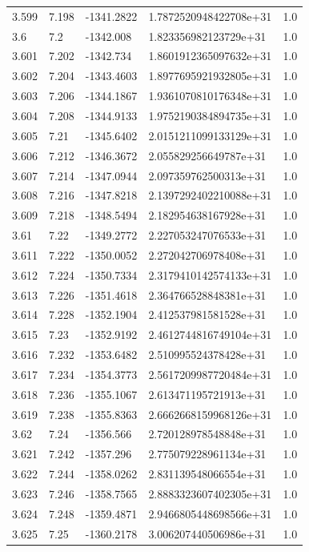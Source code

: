 \begin{tabular}{lllll}
3.599 & 7.198 & -1341.2822 & 1.7872520948422708e+31 & 1.0 \\
3.6 & 7.2 & -1342.008 & 1.823356982123729e+31 & 1.0 \\
3.601 & 7.202 & -1342.734 & 1.8601912365097632e+31 & 1.0 \\
3.602 & 7.204 & -1343.4603 & 1.8977695921932805e+31 & 1.0 \\
3.603 & 7.206 & -1344.1867 & 1.9361070810176348e+31 & 1.0 \\
3.604 & 7.208 & -1344.9133 & 1.9752190384894735e+31 & 1.0 \\
3.605 & 7.21 & -1345.6402 & 2.0151211099133129e+31 & 1.0 \\
3.606 & 7.212 & -1346.3672 & 2.055829256649787e+31 & 1.0 \\
3.607 & 7.214 & -1347.0944 & 2.097359762500313e+31 & 1.0 \\
3.608 & 7.216 & -1347.8218 & 2.1397292402210088e+31 & 1.0 \\
3.609 & 7.218 & -1348.5494 & 2.182954638167928e+31 & 1.0 \\
3.61 & 7.22 & -1349.2772 & 2.227053247076533e+31 & 1.0 \\
3.611 & 7.222 & -1350.0052 & 2.272042706978408e+31 & 1.0 \\
3.612 & 7.224 & -1350.7334 & 2.3179410142574133e+31 & 1.0 \\
3.613 & 7.226 & -1351.4618 & 2.364766528848381e+31 & 1.0 \\
3.614 & 7.228 & -1352.1904 & 2.412537981581528e+31 & 1.0 \\
3.615 & 7.23 & -1352.9192 & 2.4612744816749104e+31 & 1.0 \\
3.616 & 7.232 & -1353.6482 & 2.510995524378428e+31 & 1.0 \\
3.617 & 7.234 & -1354.3773 & 2.5617209987720484e+31 & 1.0 \\
3.618 & 7.236 & -1355.1067 & 2.613471195721913e+31 & 1.0 \\
3.619 & 7.238 & -1355.8363 & 2.6662668159968126e+31 & 1.0 \\
3.62 & 7.24 & -1356.566 & 2.720128978548848e+31 & 1.0 \\
3.621 & 7.242 & -1357.296 & 2.775079228961134e+31 & 1.0 \\
3.622 & 7.244 & -1358.0262 & 2.831139548066554e+31 & 1.0 \\
3.623 & 7.246 & -1358.7565 & 2.8883323607402305e+31 & 1.0 \\
3.624 & 7.248 & -1359.4871 & 2.9466805448698566e+31 & 1.0 \\
3.625 & 7.25 & -1360.2178 & 3.006207440506986e+31 & 1.0 \\

\end{tabular}
